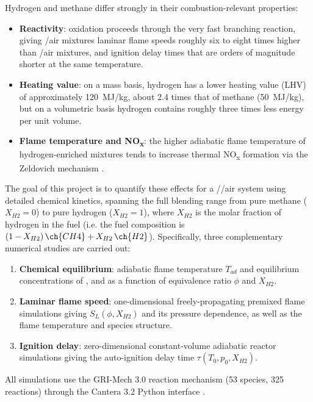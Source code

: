 \documentclass[11pt,a4paper]{article}
\begin{document}
Hydrogen and methane differ strongly in their combustion-relevant properties:
\begin{itemize}
    \item \textbf{Reactivity}:  oxidation proceeds through the very fast  branching
    reaction, giving /air mixtures laminar flame speeds roughly six to eight times higher than /air
    mixtures, and ignition delay times that are orders of magnitude shorter at the same temperature.
    \item \textbf{Heating value}: on a mass basis, hydrogen has a lower heating value (LHV) of approximately
    \SI{120}{MJ/kg}, about 2.4 times that of methane (\SI{50}{MJ/kg}), but on a volumetric basis hydrogen contains
    roughly three times less energy per unit volume.
    \item \textbf{Flame temperature and NO\textsubscript{x}}: the higher adiabatic flame temperature of hydrogen-enriched
    mixtures tends to increase thermal NO\textsubscript{x} formation via the Zeldovich mechanism \cite{zeldovich1946}.
\end{itemize}

The goal of this project is to quantify these effects for a //air system using detailed chemical
kinetics, spanning the full blending range from pure methane ($X_{H2}=0$) to pure hydrogen ($X_{H2}=1$), where
$X_{H2}$ is the molar fraction of hydrogen in the fuel (i.e. the fuel composition is
$(1-X_{H2})\,\ch{CH4} + X_{H2}\,\ch{H2}$). Specifically, three complementary numerical studies are carried out:

\begin{enumerate}
    \item \textbf{Chemical equilibrium}: adiabatic flame temperature $T_{ad}$ and equilibrium concentrations of
    ,  and  as a function of equivalence ratio $\phi$ and $X_{H2}$.
    \item \textbf{Laminar flame speed}: one-dimensional freely-propagating premixed flame simulations giving
    $S_L(\phi, X_{H2})$ and its pressure dependence, as well as the flame temperature and species structure.
    \item \textbf{Ignition delay}: zero-dimensional constant-volume adiabatic reactor simulations giving the
    auto-ignition delay time $\tau(T_0, p_0, X_{H2})$.
\end{enumerate}

All simulations use the GRI-Mech 3.0 reaction mechanism \cite{gri30} (53 species, 325 reactions) through the
Cantera 3.2 Python interface \cite{cantera}.
\end{document}
